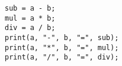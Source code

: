 \begin{lstlisting}[numbers=none]
sub = a - b;
mul = a * b;
div = a / b;
print(a, "-", b, "=", sub);
print(a, "*", b, "=", mul);
print(a, "/", b, "=", div);

\end{lstlisting}